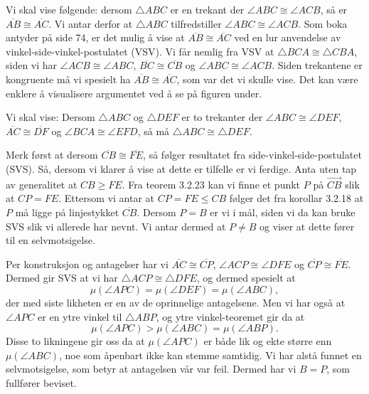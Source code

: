 \begin{oppgave}[4.2.1]
    Vi skal vise følgende: dersom $\triangle ABC$ er en trekant der $\angle ABC\cong \angle ACB$, så er $\overline{AB}\cong \overline{AC}$. 
    Vi antar derfor at $\triangle ABC$ tilfredstiller $\angle ABC\cong \angle ACB$.
    Som boka antyder på side 74, er det mulig å vise at $\overline{AB}\cong \overline{AC}$ ved en lur anvendelse av vinkel-side-vinkel-postulatet (VSV).
    Vi får nemlig fra VSV at $\triangle BCA\cong \triangle CBA$, siden vi har $\angle ACB\cong \angle ABC$, $\overline{BC}\cong \overline{CB}$ og $\angle ABC\cong \angle ACB$.
    Siden trekantene er kongruente må vi spesielt ha $\overline{AB}\cong \overline{AC}$, som var det vi skulle vise. 
    Det kan være enklere å visualisere argumentet ved å se på figuren under. 

    \begin{figure}[H]
        \centering
        
    \end{figure}
\end{oppgave}

\begin{oppgave}[4.2.2]
    Vi skal vise: Dersom $\triangle ABC$ og $\triangle DEF$ er to trekanter der $\angle ABC\cong \angle DEF$, $\overline{AC}\cong \overline{DF}$ og $\angle BCA\cong \angle EFD$, så må $\triangle ABC\cong \triangle DEF$. 

    Merk først at dersom $\overline{CB}\cong \overline{FE}$, så følger resultatet fra side-vinkel-side-postulatet (SVS). 
    Så, dersom vi klarer å vise at dette er tilfelle er vi ferdige. 
    Anta uten tap av generalitet at $CB\geq FE$. 
    Fra teorem 3.2.23 kan vi finne et punkt $P$ på $\overrightarrow{CB}$ slik at $CP=FE$. 
    Ettersom vi antar at $CP=FE\leq CB$ følger det fra korollar 3.2.18 at $P$ må ligge på linjestykket $\overline{CB}$. 
    Dersom $P=B$ er vi i mål, siden vi da kan bruke SVS slik vi allerede har nevnt. 
    Vi antar dermed at $P\neq B$ og viser at dette fører til en selvmotsigelse. 

    Per konstruksjon og antagelser har vi $\overline{AC}\cong \overline{CP}$, $\angle ACP\cong \angle DFE$ og $\overline{CP}\cong \overline{FE}$. 
    Dermed gir SVS at vi har $\triangle ACP\cong \triangle DFE$, og dermed spesielt at
    $$\mu(\angle APC)=\mu(\angle DEF)=\mu(\angle ABC),$$
    der med siste likheten er en av de oprinnelige antagelsene. 
    Men vi har også at $\angle APC$ er en ytre vinkel til $\triangle ABP$, og ytre vinkel-teoremet gir da at 
    $$\mu(\angle APC)>\mu(\angle ABC)=\mu(\angle ABP).$$
    Disse to likningene gir oss da at $\mu(\angle APC)$ er både lik og ekte større enn $\mu(\angle ABC)$, noe som åpenbart ikke kan stemme samtidig. 
    Vi har alstå funnet en selvmotsigelse, som betyr at antagelsen vår var feil. 
    Dermed har vi $B=P$, som fullfører beviset. 

    \begin{figure}[H]
        \centering
        
    \end{figure}

\end{oppgave}

